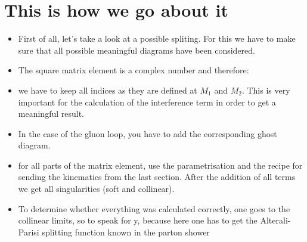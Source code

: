 \section*{This is how we go about it}
\begin{itemize}
\item First of all, let's take a look at a possible spliting. For this we have to make sure that all possible meaningful diagrams have been considered. 
\item The square matrix element is a complex number and therefore:
\item we have to keep all indices as they are defined at $M_1$ and $M_2$. This is very important for the calculation of the interference term in order to get a meaningful result.
\item In the case of the gluon loop, you have to add the corresponding ghost diagram.
\item for all parts of the matrix element, use the parametrisation and the recipe for sending the kinematics from the last section.
After the addition of all terms we get all singularities (soft and collinear). 
\item To determine whether everything was calculated correctly, one goes to the collinear limits, so to speak for y, because here one has to get the Alterali-Parisi splitting function known in the parton shower
\end{itemize}